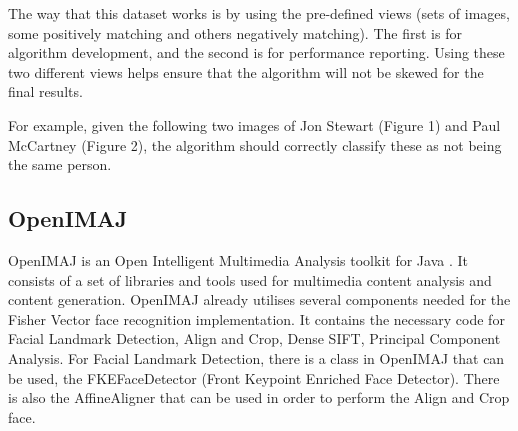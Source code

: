 \documentclass[12pt, a4paper]{article}
\begin{document}
The way that this dataset works is by using the pre-defined views (sets of images, some positively matching and others negatively matching). The first is for algorithm development, and the second is for performance reporting. Using these two different views helps ensure that the algorithm will not be skewed for the final results.

For example, given the following two images of Jon Stewart (Figure 1) and  Paul McCartney (Figure 2), the algorithm should correctly classify these as not being the same person. 

\subsection{OpenIMAJ}
OpenIMAJ is an Open Intelligent Multimedia Analysis toolkit for Java \cite{openimaj}. It consists of a set of libraries and tools used for multimedia content analysis and content generation. OpenIMAJ already utilises several components needed for the Fisher Vector face recognition implementation. It contains the necessary code for Facial Landmark Detection, Align and Crop,  Dense SIFT, Principal Component Analysis. 
For Facial Landmark Detection, there is a class in OpenIMAJ that can be used, the FKEFaceDetector (Front Keypoint Enriched Face Detector). There is also the AffineAligner that can be used in order to perform the Align and Crop face. 
\end{document}
